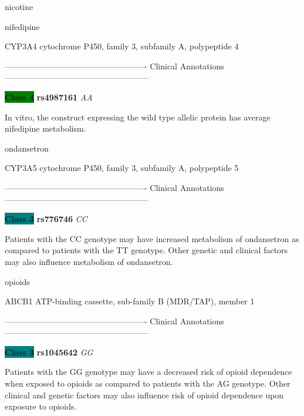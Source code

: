 \documentclass{resume} %
\begin{document}
\begin{rSection}{ nicotine }
\end{rSection}\begin{rSection}{ nifedipine }
\item[]

\begin{rSubsection}{ CYP3A4 }{ cytochrome P450, family 3, subfamily A, polypeptide 4 }{}{}
\item[]

\item[] ---------------------------------------------------- Clinical Annotations -----------------------------------------------------\newline
\item \textbf{\colorbox{green} {Class 4}} \textbf{ rs4987161 } \textit{ AA }
\item[] In vitro, the construct expressing the wild type allelic protein has average nifedipine metabolism.
\end{rSubsection}

\end{rSection}\begin{rSection}{ ondansetron }
\item[]

\begin{rSubsection}{ CYP3A5 }{ cytochrome P450, family 3, subfamily A, polypeptide 5 }{}{}
\item[]

\item[] ---------------------------------------------------- Clinical Annotations -----------------------------------------------------\newline
\item \textbf{\colorbox{teal} {Class 3}} \textbf{ rs776746 } \textit{ CC }
\item[] Patients with the CC genotype may have increased metabolism of ondansetron as compared to patients with the TT genotype. Other genetic and clinical factors may also influence metabolism of ondansetron.
\end{rSubsection}

\end{rSection}\begin{rSection}{ opioids }
\item[]

\begin{rSubsection}{ ABCB1 }{ ATP-binding cassette, sub-family B (MDR/TAP), member 1 }{}{}
\item[]

\item[] ---------------------------------------------------- Clinical Annotations -----------------------------------------------------\newline
\item \textbf{\colorbox{teal} {Class 3}} \textbf{ rs1045642 } \textit{ GG }
\item[] Patients with the GG genotype may have a decreased risk of opioid dependence when exposed to opioids as compared to patients with the AG genotype. Other clinical and genetic factors may also influence risk of opioid dependence upon exposure to opioids. 
\end{rSubsection}


\end{rSection}
\end{document}

